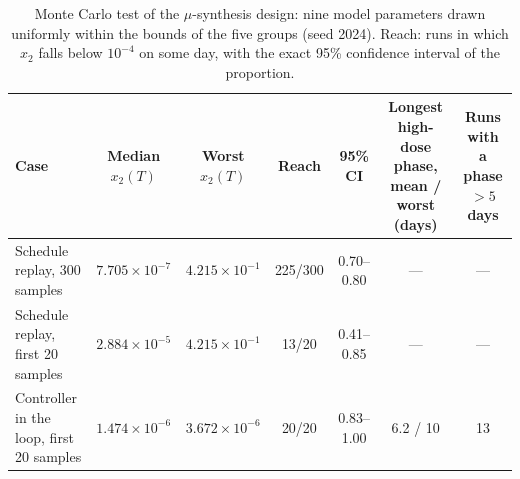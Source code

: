 \begin{table}[htbp]
\centering
\caption{Monte Carlo test of the $\mu$-synthesis design: nine model parameters drawn uniformly within the bounds of the five groups (seed 2024). Reach: runs in which $x_2$ falls below $10^{-4}$ on some day, with the exact 95\% confidence interval of the proportion.}
\label{tab:mu_mc}
\small
\begin{tabular}{lcccccc}
\toprule
Case & Median $x_2(T)$ & Worst $x_2(T)$ & Reach & 95\% CI & Longest high-dose phase, mean / worst (days) & Runs with a phase $>5$ days \\
\midrule
Schedule replay, 300 samples & $7.705{\times}10^{-7}$ & $4.215{\times}10^{-1}$ & 225/300 & 0.70--0.80 & --- & --- \\
Schedule replay, first 20 samples & $2.884{\times}10^{-5}$ & $4.215{\times}10^{-1}$ & 13/20 & 0.41--0.85 & --- & --- \\
Controller in the loop, first 20 samples & $1.474{\times}10^{-6}$ & $3.672{\times}10^{-6}$ & 20/20 & 0.83--1.00 & 6.2 / 10 & 13 \\
\bottomrule
\end{tabular}
\end{table}
